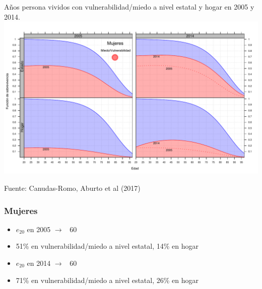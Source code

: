 \documentclass[xcolor={dvipsnames}]{beamer}
\begin{document}
\begin{frame}
\begin{center}
A\~nos persona vividos con vulnerabilidad/miedo a nivel estatal y hogar en 2005 y 2014.
		\includegraphics[scale=.45]{Figures/Fig6}
				\end{center}			
								\tiny{Fuente: Canudas-Romo, Aburto et al (2017)}
		

\end{frame}

\begin{frame}\frametitle{Mujeres}
\Large{
		\begin{itemize}
		
		\item<1-> $e_{20}$ en 2005 $\longrightarrow$ ~60
		\pause
        \item<1-> 51\% en vulnerabilidad/miedo a nivel estatal, 14\% en hogar
        \pause
        \item<1-> $e_{20}$ en 2014 $\longrightarrow$ ~60
		\pause
        \item<1-> 71\% en vulnerabilidad/miedo a nivel estatal, 26\% en hogar
		\end{itemize}
		\pause
{}
		
		
}

\end{frame}
\end{document}

